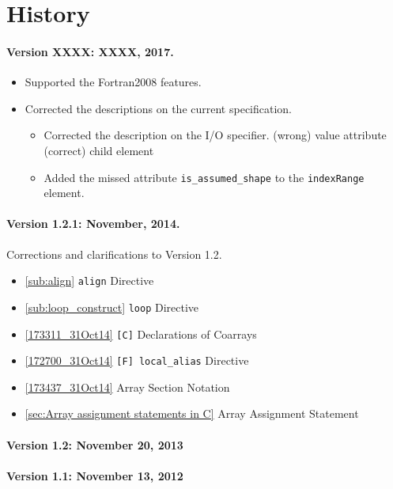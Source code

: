 \section*{History}

\paragraph*{Version XXXX: XXXX, 2017.}
\begin{itemize}
  \item Supported the Fortran2008 features.
  \item Corrected the descriptions on the current specification.
  \begin{itemize}
    \item Corrected the description on the I/O specifier.\newline
          (wrong) value attribute \newline (correct) child element
    \item Added the missed attribute {\tt is\_assumed\_shape} to the {\tt indexRange} element.
  \end{itemize}
\end{itemize}

\paragraph*{Version 1.2.1: November, 2014.} Corrections and
clarifications to Version 1.2.

\begin{itemize}
  \item \ref{sub:align} {\tt align} Directive
  \item \ref{sub:loop_construct} {\tt loop} Directive
  \item \ref{173311_31Oct14} {\tt [C]} Declarations of Coarrays
  \item \ref{172700_31Oct14} {\tt [F] local\_alias} Directive
  \item \ref{173437_31Oct14} Array Section Notation
  \item \ref{sec:Array assignment statements in C} Array Assignment Statement

\end{itemize}

\paragraph*{Version 1.2: November 20, 2013}

\paragraph*{Version 1.1: November 13, 2012}

